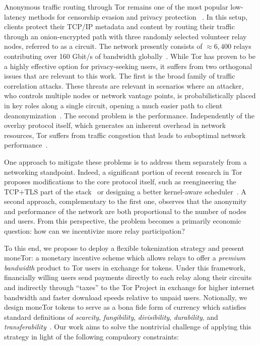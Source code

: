 Anonymous traffic routing through Tor remains one of the most popular low-latency methods for censorship evasion and privacy protection ~\cite{dingledine2004tor}.
In this setup, clients protect their TCP/IP metadata and content by routing their traffic through an onion-encrypted path with three randomly selected volunteer relay nodes, referred to as a circuit.
The network presently consists of $\approx 6,400$ relays contributing over 160 Gbit/s of bandwidth globally~\cite{portal2018tormetrics}.
While Tor has proven to be a highly effective option for privacy-seeking users, it suffers from two orthogonal issues that are relevant to this work.
The first is the broad family of traffic correlation attacks.
These threats are relevant in scenarios where an attacker, who controls multiple nodes or network vantage points, is probabilistically placed in key roles along a single circuit, opening a much easier path to client deanonymization~\cite{wright2004predecessor,murdoch2005low}.
The second problem is the performance.
Independently of the overlay protocol itself, which generates an inherent overhead in network resources, Tor suffers from traffic congestion that leads to suboptimal network performance~\cite{portal2018tormetrics, alsabah2016performance}.

One approach to mitigate these problems is to address them separately from a networking standpoint.
Indeed, a significant portion of recent research in Tor proposes modifications to the core protocol itself, such as reengineering the TCP+TLS part of the stack~\cite{reardon2009improving} or designing a better kernel-aware scheduler~\cite{jansen2014never}.
A second approach, complementary to the first one, observes that the anonymity and performance of the network are both proportional to the number of nodes and users.
From this perspective, the problem becomes a primarily economic question: how can we incentivize more relay participation?

To this end, we propose to deploy a flexible tokenization strategy and present moneTor: a monetary incentive scheme which allows relays to offer a \emph{premium bandwidth} product to Tor users in exchange for tokens.
Under this framework, financially willing users send payments directly to each relay along their circuits and indirectly through ``taxes'' to the Tor Project in exchange for higher internet bandwidth and faster download speeds relative to unpaid users.
Notionally, we design moneTor tokens to serve as a bona fide form of currency which satisfies standard definitions of \textit{scarcity}, \textit{fungibility}, \textit{divisibility}, \textit{durability}, and \textit{transferability}~\cite[p.3]{crump2011phenomenon}.
Our work aims to solve the nontrivial challenge of applying this strategy in light of the following compulsory constraints:

